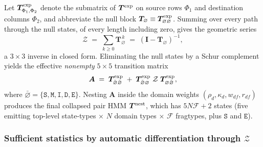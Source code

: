 \documentclass[11pt]{article}
\newcommand{\hst}[1]{\texttt{#1}}
\newcommand{\Tnull}{\bm{T}_{\varnothing}}
\newcommand{\Zsum}{\mathcal{Z}}
\newcommand{\Aeff}{\bm{A}}
\begin{document}
Let $\bm{T}^{\rm exp}_{\Phi_1,\Phi_2}$ denote the submatrix of
$\bm{T}^{\rm exp}$ on source rows $\Phi_1$ and destination columns
$\Phi_2$, and abbreviate the null block
$\Tnull\equiv\bm{T}^{\rm exp}_{\varnothing\varnothing}$. 
Summing over every path through the null states, of every length including 
zero, gives the geometric series
\begin{equation}
\label{eq:nullsum}
\Zsum \;=\; \sum_{k\ge0}\Tnull^{\,k}
        \;=\;(\bm{I}-\Tnull)^{-1},
\end{equation}
a $3{\times}3$ inverse in closed form. Eliminating the null states by a 
Schur complement yields the effective \emph{nonempty} $5{\times}5$ 
transition matrix
\begin{equation}
\label{eq:Aeff}
\Aeff \;=\; \bm{T}^{\rm exp}_{\bar\varnothing\bar\varnothing}
      \;+\; \bm{T}^{\rm exp}_{\bar\varnothing\varnothing}\;\Zsum\;
            \bm{T}^{\rm exp}_{\varnothing\bar\varnothing},
\end{equation}
where $\bar\varnothing=\{\hst{S},\hst{M},\hst{I},\hst{D},\hst{E}\}$.
Nesting $\Aeff$ inside the domain
weights $(\rho_d,\kappa_d,w_{df},r_{df})$ produces the final collapsed
pair HMM $\bm{T}^{\rm nest}$, which has $5N \mathcal F {+}2$ states (five emitting
top-level state-types $\times$ $N$ domain types $\times$ $\mathcal F$ fragtypes,
plus $\hst{S}$ and $\hst{E}$).

\subsubsection{Sufficient statistics by automatic differentiation through \texorpdfstring{$\Zsum$}{Z}}
\end{document}
